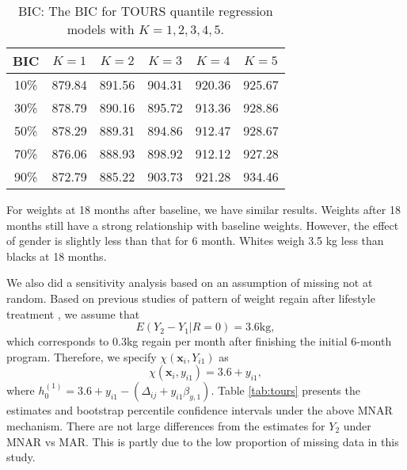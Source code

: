 \documentclass[12pt]{article}
\begin{document}
\begin{table}[htbp]
\caption[]{\label{tab:bic} BIC: The BIC for TOURS quantile regression models with $K = 1, 2, 3, 4, 5$.}
\vspace{4mm}
\begin{center}
\begin{tabular}[h]{cccccc}
\hline
BIC& $K = 1$ & $K = 2$ & $K = 3$ & $K = 4$ & $K = 5$ \\
\hline
10\% & 879.84 & 891.56 & 904.31 & 920.36 & 925.67 \\
  30\% & 878.79 & 890.16 & 895.72 & 913.36 & 928.86 \\
  50\% & 878.29 & 889.31 & 894.86 & 912.47 & 928.67 \\
  70\% & 876.06 & 888.93 & 898.92 & 912.12 & 927.28 \\
  90\% & 872.79 & 885.22 & 903.73 & 921.28 & 934.46 \\
\hline
\end{tabular}
\end{center}
\end{table}

For weights at 18 months after baseline, we have similar results.
Weights after 18 months still have a strong relationship with baseline weights.
However, the effect of gender is slightly less than that for 6 month.
Whites weigh 3.5 kg less than blacks at 18 months.

We also did a sensitivity analysis based on an assumption of missing
not at random.  Based on previous studies of pattern of weight regain
after lifestyle treatment \citep{wadden2001, perri2008extended}, we
assume that
\begin{displaymath}
  E(Y_2 - Y_1| R=0) = 3.6 \mbox{kg},
\end{displaymath}
which corresponds to 0.3kg regain per month after finishing the
initial 6-month program.
Therefore, we specify  $\chi(\bm x_{i}, Y_{i1})$ as
\begin{displaymath}
\chi(\bm x_{i},  y_{i1}) = 3.6  + y_{i1},
\end{displaymath}
where $h_0^{(1)} = 3.6 + y_{i1} - (\Delta_{ij} + y_{i1} \beta_{y,1})$.
Table \ref{tab:tours} presents the estimates and bootstrap percentile
confidence intervals under the above MNAR mechanism. There are not
large differences from the estimates for $Y_2$ under MNAR vs MAR. This is
partly due to the low proportion of missing data in this study.

\end{document}
